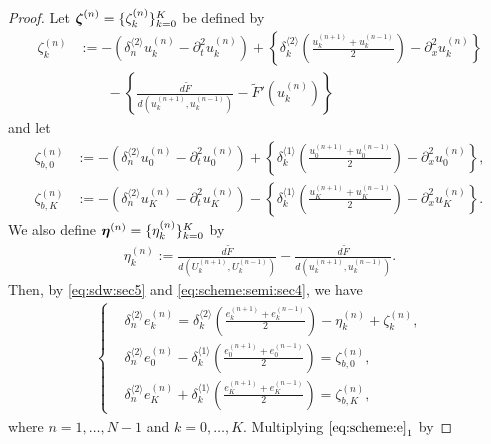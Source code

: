 \documentclass[dvipdfmx-if-dvi,autodetect-engine,ja=standard]{amsart}
\numberwithin{equation}{section} %
\def\vect#1{\mbox{\boldmath $#1$}} %
\begin{document}
\begin{proof}
Let
$\vect{\zeta}^{(n)}=\{ \zeta_k^{(n)} \}_{k=0}^{K}$
be defined by
\begin{align}
    \zeta_k^{(n)}
    &:=
    -( \delta_n^{\langle 2 \rangle} u_k^{(n)} - \partial_t^2 u_k^{(n)} )
    + \left\{ \delta_k^{\langle 2 \rangle} 
    \left( \frac{u_k^{(n+1)} + u_k^{(n-1)}}{2} \right) - \partial_x^2 u_k^{(n)} \right\} \\
    &\qquad - \left\{  \frac{d \widetilde{F}}{d(u_k^{(n+1)},u_k^{(n-1)})} - \tilde{F}'(u_k^{(n)}) \right\}
 \end{align}
and let
\begin{align}
    \zeta_{b,0}^{(n)}
    &:=
    -( \delta_n^{\langle 2\rangle} u_0^{(n)} - \partial_t^2 u_0^{(n)} )
    + \left\{ \delta_k^{\langle 1\rangle}
    \left( \frac{u_0^{(n+1)} + u_0^{(n-1)}}{2} \right) - \partial_x^2 u_0^{(n)} \right\},\\
    \zeta_{b,K}^{(n)}
    &:=
    -( \delta_n^{\langle 2\rangle} u_K^{(n)} - \partial_t^2 u_K^{(n)} )
    - \left\{ \delta_k^{\langle 1\rangle}
    \left( \frac{u_K^{(n+1)} + u_K^{(n-1)}}{2} \right) - \partial_x^2 u_K^{(n)} \right\}.
\end{align}
We also define
$\vect{\eta}^{(n)} = \{ \eta_k^{(n)} \}_{k=0}^K$
by
\begin{align}
    \eta_k^{(n)}
    := \frac{d \widetilde{F}}{d(U_k^{(n+1)}, U_k^{(n-1)})}
    - \frac{d \widetilde{F}}{d(u_k^{(n+1)}, u_k^{(n-1)})}.
\end{align}
Then, by \eqref{eq:sdw:sec5} and \eqref{eq:scheme:semi:sec4},
we have
\begin{align}\label{eq:scheme:e}
    \left\{
    \begin{alignedat}{1}
    &\delta_n^{\langle 2\rangle} e_k^{(n)}
    = \delta_k^{\langle 2 \rangle}
    \left(
        \frac{e_k^{(n+1)}+e_k^{(n-1)}}{2}
    \right)
    - \eta_k^{(n)} + \zeta_k^{(n)}
        ,\\
    &\delta_n^{\langle 2\rangle} e_0^{(n)}
        - \delta_k^{\langle 1 \rangle}
        \left(
            \frac{e_0^{(n+1)}+e_0^{(n-1)}}{2}
        \right)
        = \zeta_{b,0}^{(n)},\\
    &\delta_n^{\langle 2\rangle} e_K^{(n)}
       + \delta_k^{\langle 1 \rangle}
        \left(
            \frac{e_K^{(n+1)}+e_K^{(n-1)}}{2}
        \right)
        = \zeta_{b,K}^{(n)},
    \end{alignedat}
    \right.
\end{align}
where
$n=1,\ldots,N-1$ and $k=0,\ldots,K$.
Multiplying $\eqref{eq:scheme:e}_1$ by

\end{proof}
\end{document}
